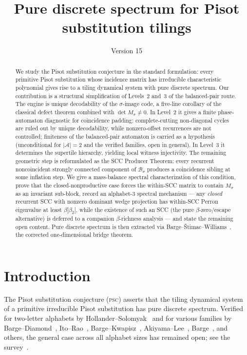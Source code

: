 \documentclass[11pt]{article}
\title{Pure discrete spectrum for Pisot substitution tilings}
\author{}
\date{Version 15}
\theoremstyle{plain}
\theoremstyle{definition}
\theoremstyle{remark}
\newcommand{\PSC}{\textsc{psc}}
\newcommand{\PDS}{pure discrete spectrum}
\newcommand{\A}{\mathcal{A}}
\newcommand{\B}{\mathcal{B}}
\begin{document}
\maketitle

\begin{abstract}
We study the Pisot substitution conjecture in the standard formulation: every primitive Pisot substitution whose incidence matrix has irreducible characteristic polynomial gives rise to a tiling dynamical system with \PDS. Our contribution is a structural simplification of Levels~2 and~3 of the balanced-pair route. The engine is unique decodability of the $\sigma$-image code, a five-line corollary of the classical defect theorem combined with $\det M_\sigma\ne 0$. In Level~2 it gives a finite phase-automaton diagnostic for coincidence padding: complete-cutting non-diagonal cycles are ruled out by unique decodability, while nonzero-offset recurrences are not controlled; finiteness of the balanced-pair automaton is carried as a hypothesis (unconditional for $|\A|=2$ and the verified families, open in general). In Level~3 it determines the supertile hierarchy, yielding local witness injectivity. The remaining geometric step is reformulated as the SCC Producer Theorem: every recurrent noncoincident strongly connected component of $\B_\sigma$ produces a coincidence sibling at some inflation step. We give a mass-balance spectral characterization of this condition, prove that the closed-nonproductive case forces the within-SCC matrix to contain $M_\sigma$ as an invariant sub-block, record an alphabet-3 spectral mechanism --- any \emph{closed} recurrent SCC with nonzero dominant wedge projection has within-SCC Perron eigenvalue at least $\beta|\beta_2|$, while the existence of such an SCC (the pure $\beta$-zero/escape alternative) is deferred to a companion $\beta$-richness analysis --- and state the remaining open content. Pure discrete spectrum is then extracted via Barge--\v{S}timac--Williams~\cite{BSW}, the corrected one-dimensional bridge theorem.
\end{abstract}

\section{Introduction}\label{sec:intro}

The Pisot substitution conjecture (\PSC) asserts that the tiling dynamical system of a primitive irreducible Pisot substitution has \PDS. Verified for two-letter alphabets by Hollander--Solomyak~\cite{HS} and for various families by Barge--Diamond~\cite{BD}, Ito--Rao~\cite{IR}, Barge--Kwapisz~\cite{BK}, Akiyama--Lee~\cite{AL}, Barge~\cite{Barge2018}, and others, the general case across all alphabet sizes has remained open; see the survey~\cite{ABBLS}.
\end{document}
